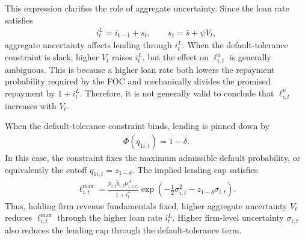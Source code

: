 \documentclass[12pt]{article}
\numberwithin{equation}{section}
\begin{document}
\begin{appendix}
This expression clarifies the role of aggregate uncertainty. Since the loan rate satisfies
\begin{align*}
    i^L_t=i_{t-1}+s_t,
    \qquad
    s_t=\bar s+\psi V_t,
\end{align*}
aggregate uncertainty affects lending through $i^L_t$. When the default-tolerance constraint is slack, higher $V_t$ raises $i^L_t$, but the effect on $\ell^u_{i,t}$ is generally ambiguous. This is because a higher loan rate both lowers the repayment probability required by the FOC and mechanically divides the promised repayment by $1+i^L_t$. Therefore, it is not generally valid to conclude that $\ell^u_{i,t}$ increases with $V_t$.

When the default-tolerance constraint binds, lending is pinned down by
\begin{align*}
    \Phi(q_{1i,t})=1-\delta.
\end{align*}
In this case, the constraint fixes the maximum admissible default probability, or equivalently the cutoff $q_{1i,t}=z_{1-\delta}$. The implied lending cap satisfies
\begin{align*}
    \ell^{\max}_{i,t}
    =
    \frac{
    p_{i,t}\tilde y_{i,t}\mu^A_{i, t|\mathcal{I}_t}
    }
    {1+i^L_t}
    \exp\left(
    -\frac{1}{2}\sigma^2_{i,t}
    -
    z_{1-\delta}\sigma_{i,t}
    \right).
\end{align*}
Thus, holding firm revenue fundamentals fixed, higher aggregate uncertainty $V_t$ reduces $\ell^{\max}_{i,t}$ through the higher loan rate $i^L_t$. Higher firm-level uncertainty $\sigma_{i,t}$ also reduces the lending cap through the default-tolerance term.


\end{appendix}
\end{document}
